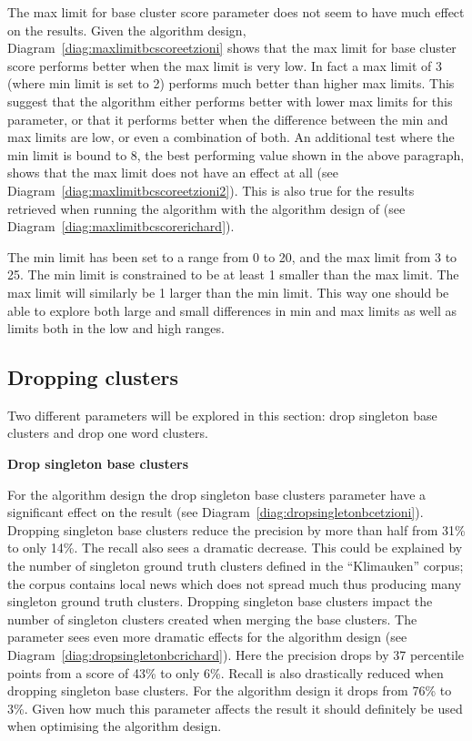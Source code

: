 The max limit for base cluster score parameter does not seem to have much effect on the results. Given the \citeauthor{Oren1998} algorithm design, Diagram~\ref{diag:maxlimitbcscoreetzioni} shows that the max limit for base cluster score performs better when the max limit is very low. In fact a max limit of 3 (where min limit is set to 2) performs much better than higher max limits. This suggest that the algorithm either performs better with lower max limits for this parameter, or that it performs better when the difference between the min and max limits are low, or even a combination of both. An additional test where the min limit is bound to 8, the best performing value shown in the above paragraph, shows that the max limit does not have an effect at all (see Diagram~\ref{diag:maxlimitbcscoreetzioni2}). This is also true for the results retrieved when running the \CTC algorithm with the algorithm design of \citeauthor{Moe2014compact} (see Diagram~\ref{diag:maxlimitbcscorerichard}).

The min limit has been set to a range from 0 to 20, and the max limit from 3 to 25. The min limit is constrained to be at least 1 smaller than the max limit. The max limit will similarly be 1 larger than the min limit. This way one should be able to explore both large and small differences in min and max limits as well as limits both in the low and high ranges.

\subsection{Dropping clusters}
Two different parameters will be explored in this section: drop singleton base clusters and drop one word clusters.

\textbf{Drop singleton base clusters}

For the \citeauthor{Oren1998} algorithm design the drop singleton base clusters parameter have a significant effect on the result (see Diagram~\ref{diag:dropsingletonbcetzioni}). Dropping singleton base clusters reduce the precision by more than half from 31\% to only 14\%. The recall also sees a dramatic decrease. This could be explained by the number of singleton ground truth clusters defined in the ``Klimauken'' corpus; the corpus contains local news which does not spread much thus producing many singleton ground truth clusters. Dropping singleton base clusters impact the number of singleton clusters created when merging the base clusters. The parameter sees even more dramatic effects for the \citeauthor{Moe2014compact} algorithm design (see Diagram~\ref{diag:dropsingletonbcrichard}). Here the precision drops by 37 percentile points from a score of 43\% to only 6\%. Recall is also drastically reduced when dropping singleton base clusters. For the \citeauthor{Moe2014compact} algorithm design it drops from 76\% to 3\%. Given how much this parameter affects the result it should definitely be used when optimising the algorithm design.

